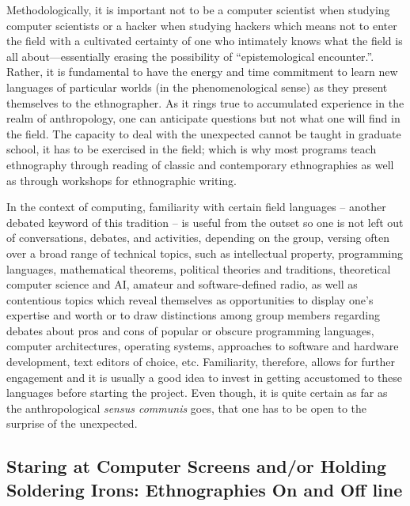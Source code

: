 \documentclass[10pt,letter,oneside]{scrartcl}
\begin{document}
					
Methodologically, it is important not to be a computer scientist when
studying computer scientists or a hacker when studying hackers which
means not to enter the field with a cultivated certainty of one who
intimately knows what the field is all about---essentially erasing the
possibility of ``epistemological encounter.''.  Rather, it is
fundamental to have the energy and time commitment to learn new
languages of particular worlds (in the phenomenological sense) as they
present themselves to the ethnographer.  As it rings true to
accumulated experience in the realm of anthropology, one can
anticipate questions but not what one will find in the field. The
capacity to deal with the unexpected cannot be taught in graduate
school, it has to be exercised in the field; which is why most programs
teach ethnography through reading of classic and contemporary
ethnographies as well as through workshops for ethnographic writing.

In the context of computing, familiarity with certain field languages
-- another debated keyword of this tradition -- is useful from the
outset so one is not left out of conversations, debates, and
activities, depending on the group, versing often over a broad range 
of technical topics, such as intellectual property, programming languages, 
mathematical theorems, political theories and traditions, theoretical 
computer science and AI, amateur and software-defined radio, as well as
contentious topics which reveal themselves as opportunities to display
one's expertise and worth or to draw distinctions among group members
regarding debates about pros and cons of popular or obscure
programming languages, computer architectures, operating systems,
approaches to software and hardware development, text editors of
choice, etc. Familiarity, therefore, allows for further engagement and
it is usually a good idea to invest in getting accustomed to these
languages before starting the project. Even though, it is quite
certain as far as the anthropological \emph{sensus communis} goes,
that one has to be open to the surprise of the unexpected.


\subsection{Staring at Computer Screens
  and/or Holding Soldering Irons: Ethnographies On and Off line}
\end{document}
